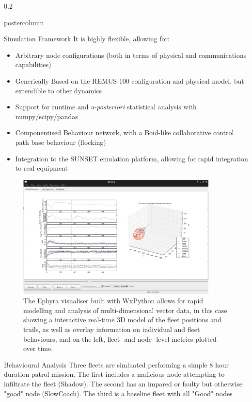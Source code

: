 \documentclass[final,hyperref={pdfpagelabels=false}]{beamer}
\def\colwidth{0.2\linewidth}
\begin{document}
\begin{frame}[fragile]
\begin{columns}[T]
\begin{column}{\colwidth}
\begin{beamercolorbox}[center,wd=\textwidth]{postercolumn}
\begin{minipage}[T]{.98\textwidth}
{\begin{block}{Simulation Framework}
							It is highly flexible, allowing for:
							\begin{itemize}
								\item Arbitrary node configurations (both in terms of physical and communications capabilities)
								\item Generically Based on the REMUS 100 configuration and physical model, but extendible to other dynamics
								\item Support for runtime and \emph{a-posteriori} statistical analysis with numpy/scipy/pandas
								\item Componentised Behaviour network, with a Boid-like collaborative control path base behaviour (flocking)
								\item Integration to the SUNSET emulation platform, allowing for rapid integration to real equipment
							\end{itemize}
							\vspace{\lineskip}
							\begin{figure}
								\includegraphics[width=0.9\textwidth]{figures/ephyra_vis}
								\caption{The Ephyra visualiser built with WxPython allows for rapid modelling and analysis of multi-dimensional vector data, in this case showing a interactive real-time 3D model of the fleet positions and trails, as well as overlay information on individual and fleet behaviours, and on the left, fleet- and node- level metrics plotted over time.}
								\label{fig:Ephyra}
							\end{figure}
						\end{block}     
						\fi
						
						\begin{block}{Behavioural Analysis}
							Three fleets are simluated performing a simple 8 hour duration patrol mission. The first includes a malicious node attempting to infiltrate the fleet (Shadow). The second has an impared or faulty but otherwise "good" node (SlowCoach). The third is a baseline fleet with all "Good" nodes
							

\end{block}}
\end{minipage}
\end{beamercolorbox}
\end{column}
\end{columns}
\end{frame}
\end{document}
